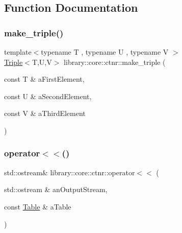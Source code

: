 \subsection{Function Documentation}
\mbox{\label{namespacelibrary_1_1core_1_1ctnr_a96a0b941c0de59772cb5e073d0c2b8a8}} 
\subsubsection{\texorpdfstring{make\_triple()}{make\_triple()}}
{\footnotesize\ttfamily template$<$typename T , typename U , typename V $>$ \\
\mbox{\hyperlink{structlibrary_1_1core_1_1ctnr_1_1_triple}{Triple}}$<$T,U,V$>$ library\+::core\+::ctnr\+::make\+\_\+triple (\begin{DoxyParamCaption}\item[{const T \&}]{a\+First\+Element,  }\item[{const U \&}]{a\+Second\+Element,  }\item[{const V \&}]{a\+Third\+Element }\end{DoxyParamCaption})}

\mbox{\label{namespacelibrary_1_1core_1_1ctnr_aae8e4f8665fde7fdd3e3f479e48c90aa}} 
\subsubsection{\texorpdfstring{operator$<$$<$()}{operator<<()}\hspace{0.1cm}{\footnotesize\ttfamily [1/4]}}
{\footnotesize\ttfamily std\+::ostream\& library\+::core\+::ctnr\+::operator$<$$<$ (\begin{DoxyParamCaption}\item[{std\+::ostream \&}]{an\+Output\+Stream,  }\item[{const \mbox{\hyperlink{classlibrary_1_1core_1_1ctnr_1_1_table}{Table}} \&}]{a\+Table }\end{DoxyParamCaption})}


\begin{DoxyCode}{0}
\end{DoxyCode}



